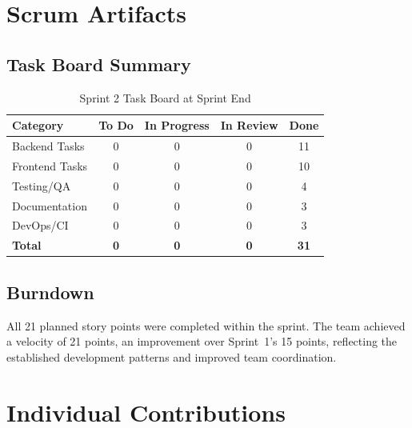 \documentclass[12pt,a4paper]{article}
\newcommand{\thead}[1]{\textbf{\color{white}#1}}
\begin{document}
\section{Scrum Artifacts}

\subsection{Task Board Summary}

\begin{table}[H]
\centering
\renewcommand{\arraystretch}{1.3}
\begin{tabularx}{\textwidth}{|Y|c|c|c|c|}
\hline
{} \thead{Category} & \thead{To Do} & \thead{In Progress} & \thead{In Review} & \thead{Done} \\
\hline
Backend Tasks   & 0 & 0 & 0 & 11 \\
\hline
{}
Frontend Tasks  & 0 & 0 & 0 & 10 \\
\hline
Testing/QA      & 0 & 0 & 0 & 4 \\
\hline
{}
Documentation   & 0 & 0 & 0 & 3 \\
\hline
DevOps/CI       & 0 & 0 & 0 & 3 \\
\hline
\textbf{Total}  & \textbf{0} & \textbf{0} & \textbf{0} & \textbf{31} \\
\hline
\end{tabularx}
\caption{Sprint 2 Task Board at Sprint End}
\end{table}

\subsection{Burndown}

All 21 planned story points were completed within the sprint. The team achieved a velocity of 21 points, an improvement over Sprint~1's 15 points, reflecting the established development patterns and improved team coordination.

\section{Individual Contributions}
\end{document}
